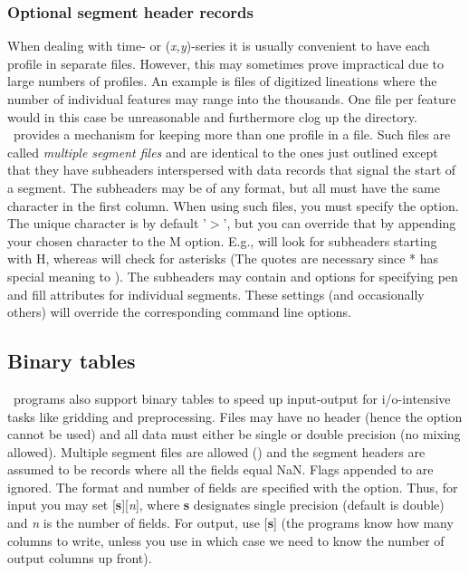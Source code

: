 \subsubsection{Optional segment header records}
When dealing with time- or ({\it x,y})-series it is usually
convenient to have each profile in separate files.
However, this may sometimes prove impractical due to large numbers
of profiles.  An example is files of digitized lineations where
the number of individual features may range into the thousands.
One file per feature would in this case be unreasonable and
furthermore clog up the directory. \GMT\ provides a mechanism for
keeping more than one profile in a file.  Such files are called
\emph{multiple segment files} and are identical to the ones
just outlined except that they have subheaders interspersed with
data records that signal the start of a segment.
The subheaders may be of any format, but all must have the same
character in the first column.  When using such files, you must
specify the  option.  The unique character is by default
'$>$', but you can override that by appending your chosen character
to the M option.  E.g.,  will look for subheaders starting
with H, whereas  will check for asterisks (The quotes
are necessary since * has special meaning to \UNIX).  The subheaders
may contain  and  options for specifying pen and
fill attributes for individual segments.  These settings (and occasionally
others) will override the corresponding command line options.

\subsection{Binary tables}

\GMT\ programs also support binary tables to speed up input-output
for i/o-intensive tasks like gridding and preprocessing.  Files
may have no header (hence the  option cannot be used)
and all data must either be single or double precision (no mixing
allowed).  Multiple segment files are allowed () and the
segment headers are assumed to be records where all the fields equal 
NaN.  Flags appended to  are ignored.  The format and number
of fields are specified with the
 option.  Thus, for input you may set [{\bf s}][{\it n}],
where {\bf s} designates single precision (default is double) and
{\it n} is the number of fields.  For output, use [{\bf s}] 
(the programs know how many columns to write, unless you use  in which
case we need to know the number of output columns up front).

